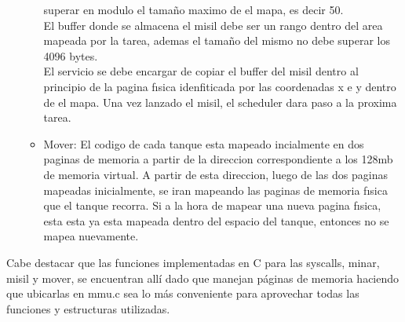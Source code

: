 \begin{itemize}
\begin{itemize}
superar en modulo el tamaño maximo de el mapa, es decir 50.\\
El buffer donde se almacena el misil debe ser un rango dentro del area mapeada por la
tarea, ademas el tamaño del mismo no debe superar los 4096 bytes.\\
El servicio se debe encargar de copiar el buffer del misil dentro al principio de la pagina
fısica idenfiticada por las coordenadas x e y dentro de el mapa. Una vez lanzado el misil,
el scheduler dara paso a la proxima tarea.\\
   \item Mover: El codigo de cada tanque esta mapeado incialmente en dos paginas de memoria a 
   partir de la direccion correspondiente a los 128mb de memoria virtual. A partir de esta
direccion, luego de las dos paginas mapeadas inicialmente, se iran mapeando las 
paginas de memoria fısica que el tanque recorra. Si a la hora de mapear una nueva pagina
fısica, esta esta ya esta mapeada dentro del espacio del tanque, entonces no se mapea
nuevamente.
  \end{itemize}

\end{itemize}

Cabe destacar que las funciones implementadas en C para las syscalls, minar, misil y mover, se encuentran allí dado que manejan p\'aginas
de memoria haciendo que ubicarlas en mmu.c sea lo m\'as conveniente para aprovechar todas las funciones y estructuras utilizadas. 

